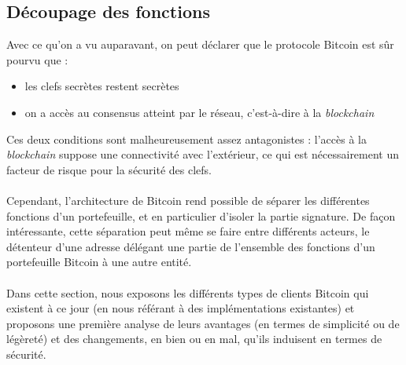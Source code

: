 \documentclass[11pt,a4paper]{article}
\begin{document}
\subsection{Découpage des fonctions}
Avec ce qu'on a vu auparavant, on peut déclarer que le protocole Bitcoin est sûr pourvu que :\begin{itemize}
	\item les clefs secrètes restent secrètes
	\item on a accès au consensus atteint par le réseau, c'est-à-dire à la \textit{blockchain}
\end{itemize}
Ces deux conditions sont malheureusement assez antagonistes : l'accès à la \textit{blockchain} suppose une connectivité avec l'extérieur, ce qui est nécessairement un facteur de risque pour la sécurité des clefs.\\\\
Cependant, l'architecture de Bitcoin rend possible de séparer les différentes fonctions d'un portefeuille, et en particulier d'isoler la partie signature. De façon intéressante, cette séparation peut même se faire entre différents acteurs, le détenteur d'une adresse délégant une partie de l'ensemble des fonctions d'un portefeuille Bitcoin à une autre entité.\\\\
Dans cette section, nous exposons les différents types de clients Bitcoin qui existent à ce jour (en nous référant à des implémentations existantes) et proposons une première analyse de leurs avantages (en termes de simplicité ou de légèreté) et des changements, en bien ou en mal, qu'ils induisent en termes de sécurité.
\end{document}
